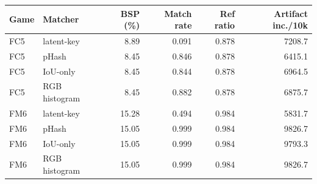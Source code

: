 \begin{tabular}{@{}llrrrr@{}}
\toprule
\textbf{Game} & \textbf{Matcher} & \textbf{BSP} (\%) & \textbf{Match rate} & \textbf{Ref ratio} & \textbf{Artifact inc./10k} \\
\midrule
FC5 & latent-key & 8.89 & 0.091 & 0.878 & 7208.7 \\
FC5 & pHash & 8.45 & 0.846 & 0.878 & 6415.1 \\
FC5 & IoU-only & 8.45 & 0.844 & 0.878 & 6964.5 \\
FC5 & RGB histogram & 8.45 & 0.882 & 0.878 & 6875.7 \\
\midrule
FM6 & latent-key & 15.28 & 0.494 & 0.984 & 5831.7 \\
FM6 & pHash & 15.05 & 0.999 & 0.984 & 9826.7 \\
FM6 & IoU-only & 15.05 & 0.999 & 0.984 & 9793.3 \\
FM6 & RGB histogram & 15.05 & 0.999 & 0.984 & 9826.7 \\
\bottomrule
\end{tabular}
